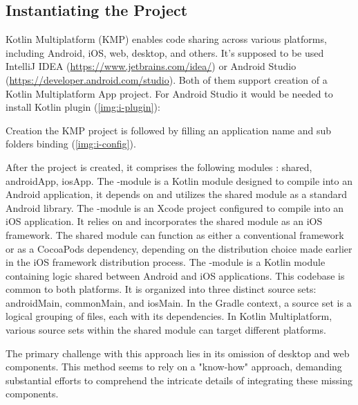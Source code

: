 
\subsection{Instantiating the Project}

Kotlin Multiplatform (KMP) enables code sharing across various platforms, including Android, iOS, web, desktop, and 
others. It's supposed to be used IntelliJ IDEA (\href{https://www.jetbrains.com/idea/}{https://www.jetbrains.com/idea/}) 
or Android Studio (\href{https://developer.android.com/studio}{https://developer.android.com/studio}). Both of them 
support creation of a Kotlin Multiplatform App project. For Android Studio it would be needed to install Kotlin plugin
(\cref{img:i-plugin}):


\noindent Creation the KMP project is followed by filling an application name and sub folders binding (\cref{img:i-config}).


\noindent After the project is created, it comprises the following modules : shared, androidApp, iosApp. The 
-module is a Kotlin module designed to compile into an Android application, it depends on and utilizes the 
shared module as a standard Android library. The -module is an Xcode project configured to compile into an iOS 
application. It relies on and incorporates the shared module as an iOS framework. The shared module can function as 
either a conventional framework or as a CocoaPods dependency, depending on the distribution choice made earlier in the 
iOS framework distribution process. The -module is a Kotlin module containing logic shared between Android and 
iOS applications. This codebase is common to both platforms. It is organized into three distinct source sets: androidMain, 
commonMain, and iosMain. In the Gradle context, a source set is a logical grouping of files, each with its dependencies. 
In Kotlin Multiplatform, various source sets within the shared module can target different platforms.

The primary challenge with this approach lies in its omission of desktop and web components. This method seems to rely 
on a "know-how" approach, demanding substantial efforts to comprehend the intricate details of integrating these missing 
components. 

